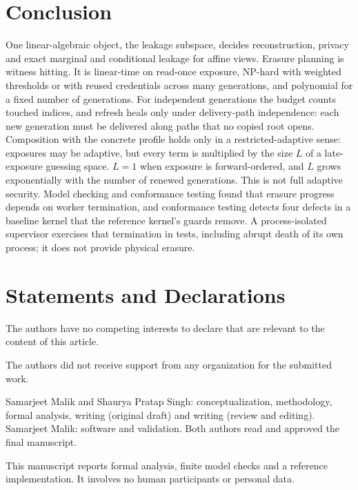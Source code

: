 \documentclass[pdflatex,sn-mathphys-num]{sn-jnl}%
\theoremstyle{plain}
\theoremstyle{definition}
\begin{document}
\section{Conclusion}
One linear-algebraic object, the leakage subspace, decides reconstruction, privacy and exact marginal and conditional leakage for affine views. Erasure planning is witness hitting. It is linear-time on read-once exposure, NP-hard with weighted thresholds or with reused credentials across many generations, and polynomial for a fixed number of generations. For independent generations the budget counts touched indices, and refresh heals only under delivery-path independence: each new generation must be delivered along paths that no copied root opens. Composition with the concrete profile holds only in a restricted-adaptive sense: exposures may be adaptive, but every term is multiplied by the size $L$ of a late-exposure guessing space. $L=1$ when exposure is forward-ordered, and $L$ grows exponentially with the number of renewed generations. This is not full adaptive security. Model checking and conformance testing found that erasure progress depends on worker termination, and conformance testing detects four defects in a baseline kernel that the reference kernel's guards remove. A process-isolated supervisor exercises that termination in tests, including abrupt death of its own process; it does not provide physical erasure.


\backmatter
\section*{Statements and Declarations}

The authors have no competing interests to declare that are relevant to the content of this article.

The authors did not receive support from any organization for the submitted work.

Samarjeet Malik and Shaurya Pratap Singh: conceptualization, methodology, formal analysis, writing (original draft) and writing (review and editing). Samarjeet Malik: software and validation. Both authors read and approved the final manuscript.

This manuscript reports formal analysis, finite model checks and a reference implementation. It involves no human participants or personal data.
\end{document}
